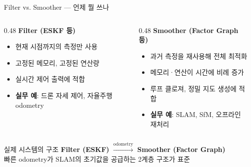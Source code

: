 \begin{frame}{Filter vs. Smoother — 언제 뭘 쓰나}
  \footnotesize
  \begin{columns}[T]
    \begin{column}{0.48\textwidth}
      \textbf{\color{blue!70!black} Filter (ESKF 등)}
      \begin{itemize}
        \item 현재 시점까지의 측정만 사용
        \item 고정된 메모리, 고정된 연산량
        \item 실시간 제어 출력에 적합
        \item \textbf{실무 예}: 드론 자세 제어, 자율주행 odometry
      \end{itemize}
    \end{column}
    \begin{column}{0.48\textwidth}
      \textbf{\color{green!50!black} Smoother (Factor Graph 등)}
      \begin{itemize}
        \item 과거 측정을 재사용해 전체 최적화
        \item 메모리·연산이 시간에 비례 증가
        \item 루프 클로져, 정밀 지도 생성에 적합
        \item \textbf{실무 예}: SLAM, SfM, 오프라인 재처리
      \end{itemize}
    \end{column}
  \end{columns}
  \vspace{0.8em}
  \begin{block}{실제 시스템의 구조}
    \textbf{Filter (ESKF)} $\xrightarrow{\text{odometry}}$ \textbf{Smoother (Factor Graph)}\\
    빠른 odometry가 SLAM의 초기값을 공급하는 2계층 구조가 표준
  \end{block}
\end{frame}

